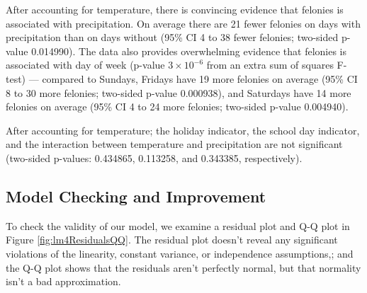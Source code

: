 \documentclass[11pt,notitlepage]{article}
\begin{document}





After accounting for temperature, there is convincing evidence that felonies is associated with precipitation. On average there are 21 fewer felonies on days with precipitation than on days without (95\% CI 4 to 38 fewer felonies; two-sided p-value 0.014990). The data also provides overwhelming evidence that felonies is associated with day of week (p-value $3 \times 10^{-6}$ from an extra sum of squares F-test) --- compared to Sundays, Fridays have 19 more felonies on average (95\% CI 8 to 30 more felonies; two-sided p-value 0.000938), and Saturdays have 14 more felonies on average (95\% CI 4 to 24 more felonies; two-sided p-value 0.004940).

After accounting for temperature; the holiday indicator, the school day indicator, and the interaction between temperature and precipitation are not significant (two-sided p-values: 0.434865, 0.113258, and 0.343385, respectively).

\subsection{Model Checking and Improvement}
\label{sec:modelFeloniesModelCheckingImprovement}

To check the validity of our model, we examine a residual plot and Q-Q plot in Figure \ref{fig:lm4ResidualsQQ}. The residual plot doesn't reveal any significant violations of the linearity, constant variance, or independence assumptions,; and the Q-Q plot shows that the residuals aren't perfectly normal, but that normality isn't a bad approximation.
\end{document}
